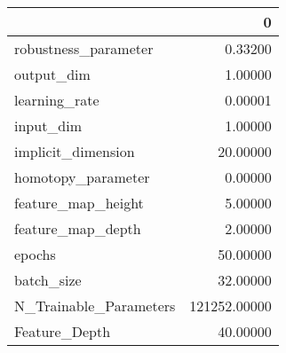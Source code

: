\begin{tabular}{lr}
\toprule
{} &             0 \\
\midrule
robustness\_parameter   &       0.33200 \\
output\_dim             &       1.00000 \\
learning\_rate          &       0.00001 \\
input\_dim              &       1.00000 \\
implicit\_dimension     &      20.00000 \\
homotopy\_parameter     &       0.00000 \\
feature\_map\_height     &       5.00000 \\
feature\_map\_depth      &       2.00000 \\
epochs                 &      50.00000 \\
batch\_size             &      32.00000 \\
N\_Trainable\_Parameters &  121252.00000 \\
Feature\_Depth          &      40.00000 \\
\bottomrule
\end{tabular}
